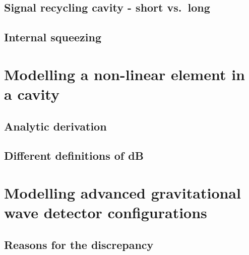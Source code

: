 \documentclass[aps,pra,superscriptaddress,reprint,nofootinbib]{revtex4-1}
\begin{document}
\subsection{Signal recycling cavity - short vs.\ long}

\subsection{Internal squeezing}



\section{Modelling a non-linear element in a cavity}
\label{sec:sqzcavity}

\subsection{Analytic derivation}





\subsection{Different definitions of dB}





\section{Modelling advanced gravitational wave detector configurations}
\label{sec:aLIGOcomparison}


\subsection{Reasons for the discrepancy}
\end{document}
